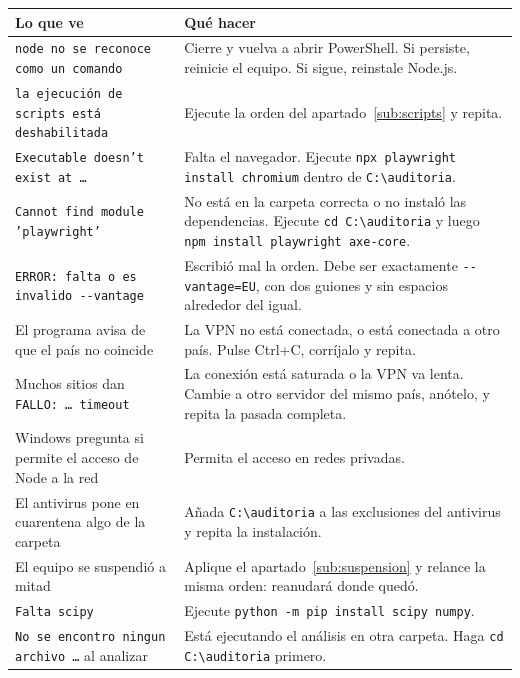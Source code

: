 \documentclass[11pt,a4paper]{article}
\begin{document}
\begin{longtable}{@{}>{\RaggedRight}p{6.0cm}>{\RaggedRight\arraybackslash}p{8.2cm}@{}}
	\toprule
	\textbf{Lo que ve} & \textbf{Qué hacer} \\
	\midrule
	\endhead
	\texttt{node no se reconoce como un comando} & Cierre y vuelva a abrir PowerShell. Si persiste, reinicie el equipo. Si sigue, reinstale Node.js. \\
	\addlinespace
	\texttt{la ejecución de scripts está deshabilitada} & Ejecute la orden del apartado~\ref{sub:scripts} y repita. \\
	\addlinespace
	\texttt{Executable doesn't exist at \dots} & Falta el navegador. Ejecute \texttt{npx playwright install chromium} dentro de \texttt{C:\textbackslash auditoria}. \\
	\addlinespace
	\texttt{Cannot find module 'playwright'} & No está en la carpeta correcta o no instaló las dependencias. Ejecute \texttt{cd C:\textbackslash auditoria} y luego \texttt{npm install playwright axe-core}. \\
	\addlinespace
	\texttt{ERROR: falta o es invalido -{}-vantage} & Escribió mal la orden. Debe ser exactamente \texttt{-{}-vantage=EU}, con dos guiones y sin espacios alrededor del igual. \\
	\addlinespace
	El programa avisa de que el país no coincide & La VPN no está conectada, o está conectada a otro país. Pulse \textsf{Ctrl+C}, corríjalo y repita. \\
	\addlinespace
	Muchos sitios dan \texttt{FALLO: \dots\ timeout} & La conexión está saturada o la VPN va lenta. Cambie a otro servidor del mismo país, anótelo, y repita la pasada completa. \\
	\addlinespace
	Windows pregunta si permite el acceso de Node a la red & Permita el acceso en redes privadas. \\
	\addlinespace
	El antivirus pone en cuarentena algo de la carpeta & Añada \texttt{C:\textbackslash auditoria} a las exclusiones del antivirus y repita la instalación. \\
	\addlinespace
	El equipo se suspendió a mitad & Aplique el apartado~\ref{sub:suspension} y relance la misma orden: reanudará donde quedó. \\
	\addlinespace
	\texttt{Falta scipy} & Ejecute \texttt{python -m pip install scipy numpy}. \\
	\addlinespace
	\texttt{No se encontro ningun archivo \dots} al analizar & Está ejecutando el análisis en otra carpeta. Haga \texttt{cd C:\textbackslash auditoria} primero. \\
	\bottomrule
\end{longtable}
\end{document}

